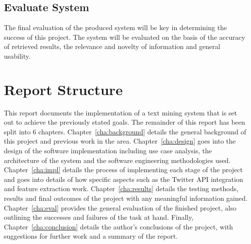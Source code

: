 \subsection{Evaluate System}
The final evaluation of the produced system will be key in determining the success of this project. The system will be evaluated on the basis of the accuracy of retrieved results, the relevance and novelty of information and general usability.

\section{Report Structure}
This report documents the implementation of a text mining system that is set out to achieve the previously stated goals. The remainder of this report has been split into 6 chapters.
Chapter~\ref{cha:background} details the general background of this project and previous work in the area.
Chapter~\ref{cha:design} goes into the design of the software implementation including use case analysis, the architecture of the system and the software engineering methodologies used.
Chapter~\ref{cha:impl} details the process of implementing each stage of the project and goes into details of how specific aspects such as the Twitter API integration and feature extraction work.
Chapter~\ref{cha:results} details the testing methods, results and final outcomes of the project with any meaningful information gained.
Chapter~\ref{cha:eval} provides the general evaluation of the finished project, also outlining the successes and failures of the task at hand.
Finally, Chapter~\ref{cha:conclusion} details the author's conclusions of the project, with suggestions for further work and a summary of the report.

